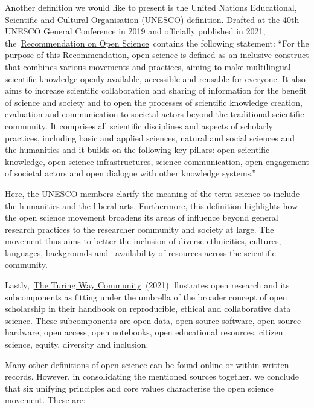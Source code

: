 \documentclass[
]{book}
\begin{document}
Another definition we would like to present is the United Nations Educational, Scientific and Cultural Organisation (\href{https://www.unesco.org/en}{UNESCO}) definition. Drafted at the 40th UNESCO General Conference in 2019 and officially published in 2021, the~\href{https://en.unesco.org/science-sustainable-future/open-science/recommendation}{}\href{https://en.unesco.org/science-sustainable-future/open-science/recommendation}{Recommendation on Open Science}~contains the following statement: ``For the purpose of this Recommendation, open science is defined as an inclusive construct that combines various movements and practices, aiming to make multilingual scientific knowledge openly available, accessible and reusable for everyone. It also aims to increase scientific collaboration and sharing of information for the benefit of science and society and to open the processes of scientific knowledge creation, evaluation and communication to societal actors beyond the traditional scientific community. It comprises all scientific disciplines and aspects of scholarly practices, including basic and applied sciences, natural and social sciences and the humanities and it builds on the following key pillars: open scientific knowledge, open science infrastructures, science communication, open engagement of societal actors and open dialogue with other knowledge systems.''

Here, the UNESCO members clarify the meaning of the term science to include the humanities and the liberal arts. Furthermore, this definition highlights how the open science movement broadens its areas of influence beyond general research practices to the researcher community and society at large. The movement thus aims to better the inclusion of diverse ethnicities, cultures, languages, backgrounds and ~availability of resources across the scientific community.

Lastly,~\href{https://the-turing-way.netlify.app/welcome}{}\href{https://the-turing-way.netlify.app/welcome}{The Turing Way Community}~(2021) illustrates open research and its subcomponents as fitting under the umbrella of the broader concept of open scholarship in their handbook on reproducible, ethical and collaborative data science. These subcomponents are open data, open-source software, open-source hardware, open access, open notebooks, open educational resources, citizen science, equity, diversity and inclusion.

Many other definitions of open science can be found online or within written records. However, in consolidating the mentioned sources together, we conclude that six unifying principles and core values characterise the open science movement. These are:
\end{document}
